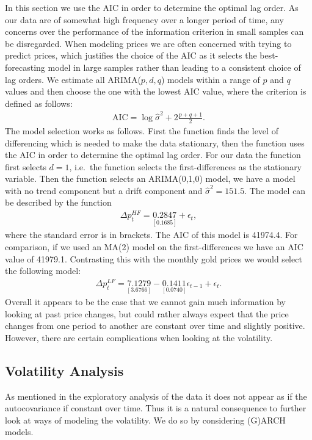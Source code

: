 \documentclass[a4paper]{article}
\theoremstyle{definition}
\begin{document}
In this section we use the AIC in order to determine the optimal lag order. As our data are of somewhat high frequency over a longer period of time, any concerns over the performance of the information criterion in small samples can be disregarded. When modeling prices we are often concerned with trying to predict prices, which justifies the choice of the AIC as it selects the best-forecasting model in large samples rather than leading to a consistent choice of lag orders. We estimate all ARIMA($p,d,q$) models within a range of $p$ and $q$ values and then choose the one with the lowest AIC value, where the criterion is defined as follows:
	\begin{align*}
	\text{AIC} = \log \hat\sigma^2 + 2 \frac{p+q+1}{2}.
	\end{align*}
The model selection works as follows. First the function finds the level of differencing which is needed to make the data stationary, then the function uses the AIC in order to determine the optimal lag order. For our data the function first selects $d=1$, i.e.\ the function selects the first-differences as the stationary variable. Then the function selects an ARIMA(0,1,0) model,  we have a model with no trend component but a drift component and $\hat\sigma^2 = 151.5$. The model can be described by the function
	\begin{align*}
	\Delta p^{HF}_{t} = \underset{[0.1685]}{0.2847} + \epsilon_{t},
	\end{align*}
where the standard error is in brackets. The AIC of this model is 41974.4. For comparison, if we used an MA(2) model on the first-differences we have an AIC value of 41979.1. Contrasting this with the monthly gold prices we would select the following model:
	\begin{align*}
	\Delta p^{LF}_{t} = \underset{[3.6766]}{7.1279} - \underset{[0.0740]}{0.1411}\epsilon_{t-1} + \epsilon_{t}.
	\end{align*}
Overall it appears to be the case that we cannot gain much information by looking at past price changes, but could rather always expect that the price changes from one period to another are constant over time and slightly positive. However, there are certain complications when looking at the volatility. 
\subsection{Volatility Analysis}
As mentioned in the exploratory analysis of the data it does not appear as if the autocovariance if constant over time. Thus it is a natural consequence to further look at ways of modeling the volatility. We do so by considering (G)ARCH models.
\newpage
\end{document}
